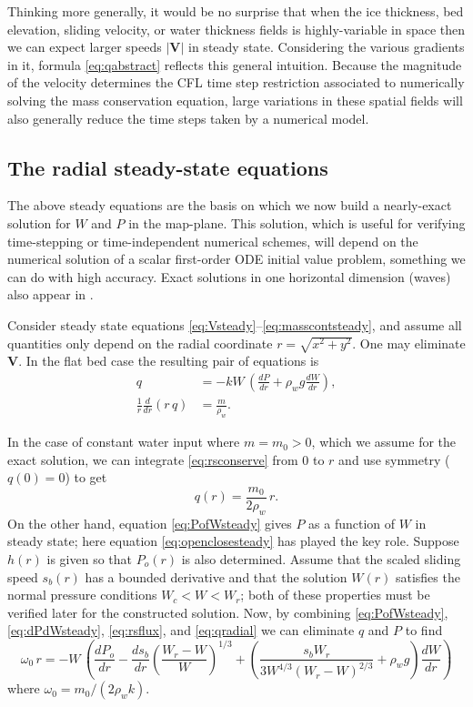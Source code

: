 \documentclass[11pt,final]{amsart}
\newcommand\bV{\mathbf{V}}
\begin{document}
Thinking more generally, it would be no surprise that when the ice thickness, bed elevation, sliding velocity, or water thickness fields is highly-variable in space then we can expect larger speeds $|\bV|$ in steady state.  Considering the various gradients in it, formula \eqref{eq:qabstract} reflects this general intuition.  Because the magnitude of the velocity determines the CFL time step restriction \citep{MortonMayers} associated to numerically solving the mass conservation equation, large variations in these spatial fields will also generally reduce the time steps taken by a numerical model.

\subsection*{The radial steady-state equations}  The above steady equations are the basis on which we now build a nearly-exact solution for $W$ and $P$ in the map-plane.  This solution, which is useful for verifying time-stepping or time-independent numerical schemes, will depend on the numerical solution of a scalar first-order ODE initial value problem, something we can do with high accuracy.  Exact solutions in one horizontal dimension (waves) also appear in \cite{Schoofetal2012}.

Consider steady state equations \eqref{eq:Vsteady}--\eqref{eq:masscontsteady}, and assume all quantities only depend on the radial coordinate $r = \sqrt{x^2+y^2}$.  One may eliminate $\bV$.  In the flat bed case the resulting pair of equations is
\begin{align}
q &= - k W\, \left(\frac{dP}{dr} + \rho_w g \frac{dW}{dr}\right), \label{eq:rsflux} \\
\frac{1}{r}\frac{d}{dr}\left(r\,q\right) &= \frac{m}{\rho_w}. \label{eq:rsconserve}
\end{align}

In the case of constant water input where $m = m_0 > 0$, which we assume for the exact solution, we can integrate \eqref{eq:rsconserve} from $0$ to $r$ and use symmetry ($q(0)=0$) to get
\begin{equation}
q(r) = \frac{m_0}{2\rho_w} \, r. \label{eq:qradial}
\end{equation}
On the other hand, equation \eqref{eq:PofWsteady} gives $P$ as a function of $W$ in steady state; here equation \eqref{eq:openclosesteady} has played the key role.  Suppose $h(r)$ is given so that $P_o(r)$ is also determined.  Assume that the scaled sliding speed $s_b(r)$ has a bounded derivative and that the solution $W(r)$ satisfies the normal pressure conditions $W_c < W < W_r$; both of these properties must be verified later for the constructed solution.  Now, by combining \eqref{eq:PofWsteady}, \eqref{eq:dPdWsteady}, \eqref{eq:rsflux}, and \eqref{eq:qradial} we can eliminate $q$ and $P$ to find
\begin{equation}
\omega_0\, r = - W\, \left(\frac{dP_o}{dr} - \frac{ds_b}{dr} \left(\frac{W_r - W}{W}\right)^{1/3} + \left(\frac{s_b W_r}{3 W^{4/3} (W_r - W)^{2/3}} + \rho_w g\right) \frac{dW}{dr}\right)  \label{eq:ODEfirst}
\end{equation}
where $\omega_0 = m_0 / (2 \rho_w k)$.
\end{document}
